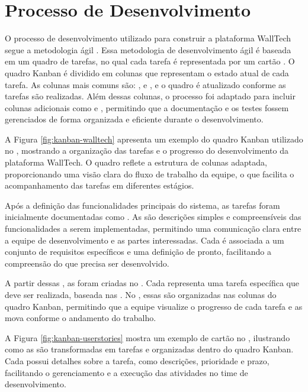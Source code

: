 \section{Processo de Desenvolvimento}
\label{section:processo-desenvolvimento}
O processo de desenvolvimento utilizado para construir a plataforma WallTech segue a metodologia ágil . Essa metodologia de desenvolvimento ágil é baseada em um quadro de tarefas, no qual cada tarefa é representada por um cartão \cite{gomes2014kanban}. O quadro Kanban é dividido em colunas que representam o estado atual de cada tarefa. As colunas mais comuns são: ,  e , e o quadro é atualizado conforme as tarefas são realizadas. Além dessas colunas, o processo foi adaptado para incluir colunas adicionais como  e , permitindo que a documentação e os testes fossem gerenciados de forma organizada e eficiente durante o desenvolvimento.

A Figura \ref{fig:kanban-walltech} apresenta um exemplo do quadro Kanban utilizado no , mostrando a organização das tarefas e o progresso do desenvolvimento da plataforma WallTech. O quadro reflete a estrutura de colunas adaptada, proporcionando uma visão clara do fluxo de trabalho da equipe, o que facilita o acompanhamento das tarefas em diferentes estágios.

Após a definição das funcionalidades principais do sistema, as tarefas foram inicialmente documentadas como . As  são descrições simples e compreensíveis das funcionalidades a serem implementadas, permitindo uma comunicação clara entre a equipe de desenvolvimento e as partes interessadas. Cada  é associada a um conjunto de requisitos específicos e uma definição de pronto, facilitando a compreensão do que precisa ser desenvolvido.

A partir dessas , as  foram criadas no . Cada  representa uma tarefa específica que deve ser realizada, baseada nas . No , essas  são organizadas nas colunas do quadro Kanban, permitindo que a equipe visualize o progresso de cada tarefa e as mova conforme o andamento do trabalho.

A Figura \ref{fig:kanban-userstories} mostra um exemplo de cartão  no , ilustrando como as  são transformadas em tarefas e organizadas dentro do quadro Kanban. Cada  possui detalhes sobre a tarefa, como descrições, prioridade e prazo, facilitando o gerenciamento e a execução das atividades no time de desenvolvimento.

